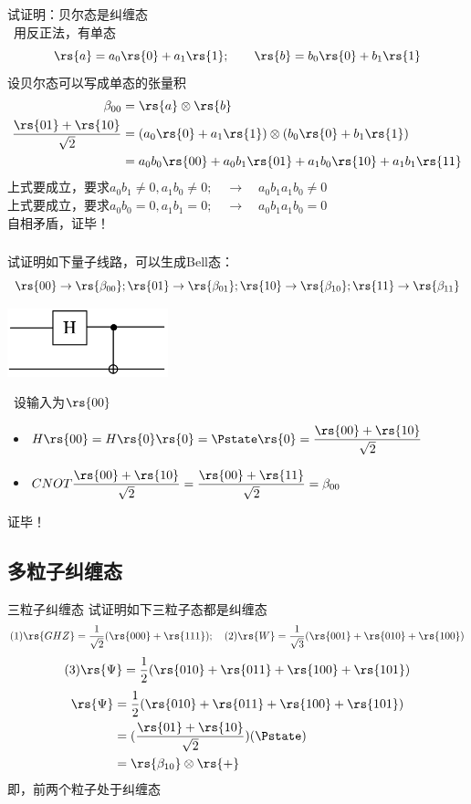 \begin{frame}
    \frametitle{}
    {\Bullet}试证明：贝尔态是纠缠态\\ \vspace{1.0em}
    \证~用反正法，有单态
    \[ \rs{a} = a_0\rs{0}+a_1\rs{1}; \qquad \rs{b} = b_0\rs{0}+b_1\rs{1}\]
    设贝尔态可以写成单态的张量积
    \[ \begin{aligned}
    \beta_{00} &= \rs{a}\otimes \rs{b} \\
    \frac{\rs{01}+\rs{10}}{\sqrt{2}} &= (a_0\rs{0}+a_1\rs{1}) \otimes (b_0\rs{0}+b_1\rs{1}) \\
    &= a_0b_0\rs{00}+ a_0b_1\rs{01}+a_1b_0\rs{10}+a_1b_1\rs{11}
    \end{aligned}\]
    上式要成立，要求$a_0b_1\ne 0, a_1b_0 \ne 0; \quad \to \quad a_0b_1a_1b_0\ne 0$ \\
    上式要成立，要求$a_0b_0= 0, a_1b_1 = 0; \quad \to \quad a_0b_1a_1b_0= 0$ \\
    自相矛盾，证毕！
\end{frame}

\begin{frame}
    \frametitle{}
    {\Bullet}试证明如下量子线路，可以生成Bell态：
    \[\rs{00}\to\rs{\beta_{00}}; \rs{01}\to\rs{\beta_{01}}; \rs{10}\to\rs{\beta_{10}}; \rs{11}\to\rs{\beta_{11}}\]
    \begin{center}
        \includegraphics[width=0.35\textwidth]{figs/30.png}
    \end{center}
    \证~设输入为$\rs{00}$ \\
    \begin{itemize}
        \item $H\rs{00}=H\rs{0}\rs{0}=\Pstate\rs{0}=\dfrac{\rs{00}+\rs{10}}{\sqrt{2}}$ 
        \item $CNOT\dfrac{\rs{00}+\rs{10}}{\sqrt{2}}=\dfrac{\rs{00}+\rs{11}}{\sqrt{2}}=\beta_{00}$
    \end{itemize}
    证毕！
\end{frame}

\subsection{多粒子纠缠态}

\begin{frame}{三粒子纠缠态}
    试证明如下三粒子态都是纠缠态
    \[ (1) \rs{GHZ}=\frac{1}{\sqrt{2}}(\rs{000}+\rs{111}); \quad (2) \rs{W}=\frac{1}{\sqrt{3}}(\rs{001}+\rs{010}+\rs{100})\] 
    \[(3) \rs{\Psi}=\frac{1}{2}(\rs{010}+\rs{011}+\rs{100}+\rs{101})\]
    \证 
    \[ \begin{aligned}
        \rs{\Psi}&=\frac{1}{2}(\rs{010}+\rs{011}+\rs{100}+\rs{101}) \\
         &=(\frac{\rs{01}+\rs{10}}{\sqrt{2}})(\Pstate) \\
         &=\rs{\beta_{10}}\otimes\rs{+}
    \end{aligned}\]
    即，前两个粒子处于纠缠态
\end{frame}

